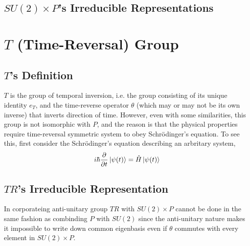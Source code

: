 \documentclass[preprint, 12pt]{revtex4-2}
\numberwithin{equation}{section}
\begin{document}
\subsection{$SU(2)\times P$'s Irreducible Representations}

\newpage
\section{$T$ (Time-Reversal) Group}

\subsection{$T$'s Definition}
$T$ is the group of temporal inversion, i.e. the group consisting of its unique identity $e_T$, and the time-reverse operator $\theta$ (which may or may not be its own inverse) that inverts direction of time. However, even with some similarities, this group is not isomorphic with $P$, and the reason is that the physical properties require time-reversal symmetric system to obey Schr\"odinger's equation. To see this, first consider the Schr\"odinger's equation describing an arbritary system,
\begin{equation}\label{eq:Schrodinger}
    i\hbar\dfrac{\partial}{\partial t}\ket{\psi(t)} = \hat{H}\ket{\psi(t)}
\end{equation}

\subsection{$TR$'s Irreducible Representation}
In corporateing anti-unitary group $TR$ with $SU(2)\times P$ cannot be done in the same fashion as combinding $P$ with $SU(2)$ since the anti-unitary nature makes it impossible to write down common eigenbasis even if $\theta$ commutes with every element in $SU(2)\times P$.
\end{document}
